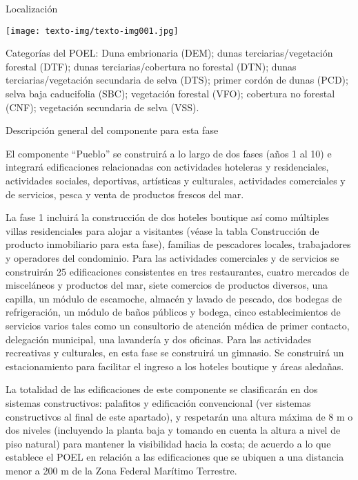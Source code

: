 \documentclass{article}
\begin{document}
\bigskip


\bigskip


\bigskip

\begin{multicols}{2}

\bigskip

Localización


\bigskip

 \texttt{[image: texto-img/texto-img001.jpg]} 


\bigskip


\bigskip

Categorías del POEL: Duna embrionaria (DEM); dunas terciarias/vegetación forestal (DTF); dunas terciarias/cobertura no forestal (DTN); dunas terciarias/vegetación secundaria de selva (DTS); primer cordón de dunas (PCD); selva baja caducifolia (SBC); vegetación forestal (VFO); cobertura no forestal (CNF); vegetación secundaria de selva (VSS).


\bigskip


\bigskip

Descripción general del componente para esta fase


\bigskip

El componente “Pueblo” se construirá a lo largo de dos fases (años 1 al 10) e integrará edificaciones relacionadas con actividades hoteleras y residenciales, actividades sociales, deportivas, artísticas y culturales, actividades comerciales y de servicios, pesca y venta de productos frescos del mar.

La fase 1 incluirá la construcción de dos hoteles boutique así como múltiples villas residenciales para alojar a visitantes (véase la tabla Construcción de producto inmobiliario para esta fase), familias de pescadores locales, trabajadores y operadores del condominio. Para las actividades comerciales y de servicios se construirán 25 edificaciones consistentes en tres restaurantes, cuatro mercados de misceláneos y productos del mar, siete comercios de productos diversos, una capilla, un módulo de escamoche, almacén y lavado de pescado, dos bodegas de refrigeración, un módulo de baños públicos y bodega, cinco establecimientos de servicios varios tales como un consultorio de atención médica de primer contacto, delegación municipal, una lavandería y dos oficinas. Para las actividades recreativas y culturales, en esta fase se construirá un gimnasio. Se construirá un estacionamiento para facilitar el ingreso a los hoteles boutique y áreas aledañas. 

La totalidad de las edificaciones de este componente se clasificarán en dos sistemas constructivos: palafitos y edificación convencional (ver sistemas constructivos al final de este apartado), y respetarán una altura máxima de 8 m o dos niveles (incluyendo la planta baja y tomando en cuenta la altura a nivel de piso natural) para mantener la visibilidad hacia la costa; de acuerdo a lo que establece el POEL en relación a las edificaciones que se ubiquen a una distancia menor a 200 m de la Zona Federal Marítimo Terrestre.


\end{multicols}
\end{document}
